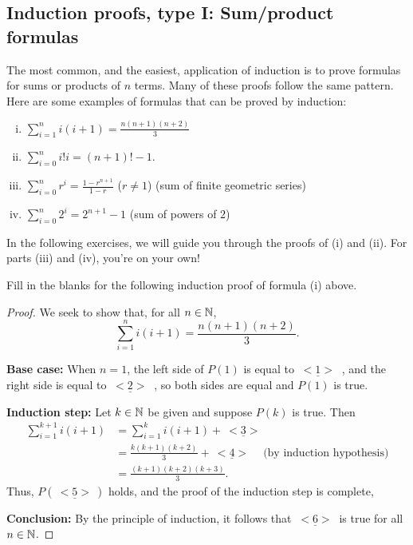 
\subsection*{Induction proofs, type I: Sum/product formulas}
 
The most common, and the easiest, application of induction is to prove
formulas for sums or products of $n$ terms. Many of these  proofs follow
the same pattern. Here are  some examples of formulas that can be proved by induction:

\begin{enumerate}[(i)]
\item 
$\sum_{i=1}^n i(i+1)=\frac{n(n+1)(n+2)}{3}$ 
\item
$\sum_{i=0}^n i! i = (n+1)!-1$. 
\item
$\sum_{i=0}^n r^i=\frac{1-r^{n+1}}{1-r}$ ($r\not=1$)
(sum of finite geometric series)
\item 
$\sum_{i=0}^n 2^i=2^{n+1}-1$ (sum of powers of $2$)
\end{enumerate}

In the following exercises, we will guide you through the proofs of (i) and (ii). For parts (iii) and (iv), you're on your own!

\begin{exercise}
Fill in the blanks for the following induction proof of formula (i) above.

\begin{proof}
We seek to show that, for all $n\in\mathbb{N}$,  
\[
\sum_{i=1}^n i(i+1)=\frac{n(n+1)(n+2)}{3}. 
\tag{ 	$P(n)$}
\]

\noindent
\textbf{Base case:} When $n=1$, the left side of $P(1)$ is equal to $\underline{~<1>~}$ ,
and the
right side is equal to $\underline{~<2>~}$ , so both sides are equal and $P(1)$ is
true.

\noindent
\textbf{Induction step:} Let $k\in\mathbb{N}$ be given and suppose 
$P(k)$ is true. Then
\begin{align*}
\sum_{i=1}^{k+1}i(i+1)
&=
\sum_{i=1}^{k}i(i+1)
+\underline{~<3>~}
\\
&=\frac{k(k+1)(k+2)}{3} 
+\underline{~<4>~} 
\quad \text{(by induction hypothesis)}
\\
&=\frac{(k+1)(k+2)(k+3)}{3}.
\end{align*}
Thus, $P(\underline{~<5>~})$ holds, and the proof of the induction step is complete, 

\noindent
\textbf{Conclusion:}
By the principle of induction,  it follows that
$\underline{~<6>~}$  is true for all $n\in\mathbb{N}$.  
\end{proof}

\end{exercise}

